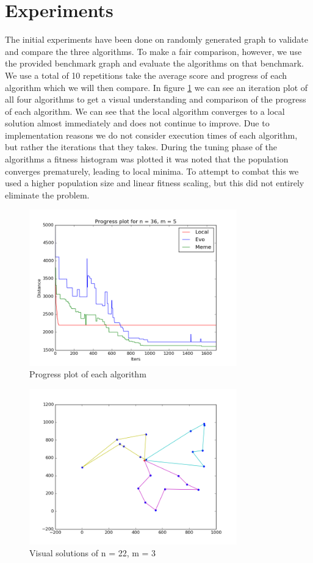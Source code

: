 \documentclass[journal]{IEEEtrancz}
\begin{document}
\section{Experiments}
The initial experiments have been done on randomly generated graph to validate and compare the three algorithms.
To make a fair comparison, however, we use the provided benchmark graph and evaluate the algorithms on that benchmark. We use a total of 10 repetitions take the average score and progress of each algorithm which we will then compare. In figure \ref{fig:progfig} we can see an iteration plot of all four algorithms to get 
a visual understanding and comparison of the progress of each algorithm. We can see that the local algorithm
converges to a local solution almost immediately and does not continue to improve. Due to implementation reasons we do not consider execution times of each algorithm, but rather the iterations that they takes. 
During the tuning phase of the algorithms a fitness histogram was plotted it was noted that the population converges prematurely, leading to local minima. To attempt to combat this we used a higher population size and linear fitness scaling, but this did not entirely eliminate the problem.




\begin{figure}[ht]
  \centering
    \includegraphics[width=9cm]{progplot}
      \caption{Progress plot of each algorithm}
    \label{fig:progfig}
\end{figure}

\begin{figure}[ht]
  \centering
    \includegraphics[width=9cm]{clean}
      \caption{Visual solutions of n = 22, m = 3}
    \label{fig:solfig}
\end{figure}
\end{document}
